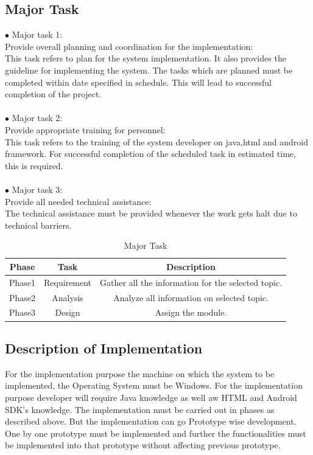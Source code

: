 \subsection{Major Task}
$ \bullet $ Major task 1: \\
Provide overall planning and coordination for the implementation: \\
\hspace*{0.7in} This task refers to plan for the system implementation. It also provides the guideline for implementing the system. The tasks which are planned must be completed within date specified in  schedule. This will lead to successful completion of the project. \\
\\
$ \bullet $ Major task 2: \\
Provide appropriate training for personnel: \\
\hspace*{0.7in} This task refers to the training of the system developer on java,html and android framework. For successful completion of the scheduled task in estimated time, this is required. \\
\\
$ \bullet $ Major task 3: \\
Provide all needed technical assistance: \\
\hspace*{0.7in} The technical assistance must be provided whenever the work gets halt due to technical barriers.

\begin{table}[h]
\begin{center}
  \centering
  \caption{Major Task}\label{Major Task}
  \begin{tabular}{|c|c|c|} \hline
    \hline
    Phase & Task & Description \\ \hline
    Phase1 & Requirement & Gather all the information for the selected topic. \\ \hline
    Phase2 & Analysis & Analyze all information on selected topic. \\ \hline
    Phase3 & Design & Assign the module. \\ \hline
  \end{tabular}
\end{center}
\end{table}


\subsection{Description of Implementation}
\hspace*{0.7in} For the implementation purpose the machine on which the system to be implemented, the Operating System must be Windows. For the implementation purpose developer will require Java knowledge as well aw HTML and Android SDK's knowledge. The implementation must be carried out in phases as described above. But the implementation can go Prototype wise development. One by one prototype must be implemented and further the functionalities must be implemented into that prototype without affecting previous prototype.

